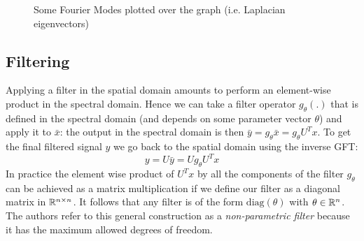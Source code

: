 \begin{figure}
    \centering
    \caption{Some Fourier Modes plotted over the graph (i.e. Laplacian eigenvectors)}
    \label{fig:fourier_modes}
\end{figure}


\subsection{Filtering}

Applying a filter in the spatial domain amounts to perform an element-wise product in the spectral domain. Hence we can take a filter operator $g_\theta(.)$ that is defined in the spectral domain (and depends on some parameter vector $\theta$) and apply it to $\bar x$: the output in the spectral domain is then $\bar y = g_\theta \bar x = g_\theta U^T x$. To get the final filtered signal $y$ we go back to the spatial domain using the inverse GFT:
%
\begin{equation}
    y = U \bar y = U g_\theta  U^T x
\end{equation}
%
In practice the element wise product of $U^T x$ by all the components of the filter $g_\theta$ can be achieved as a matrix multiplication if we define our filter as a diagonal matrix in $\mathbb{R}^{n\times n}$. It follows that any filter is of the form $\mathrm{diag}(\theta)$ with $\theta \in \mathbb{R}^n$. The authors refer to this general construction as a \textit{non-parametric filter} because it has the maximum allowed degrees of freedom.

